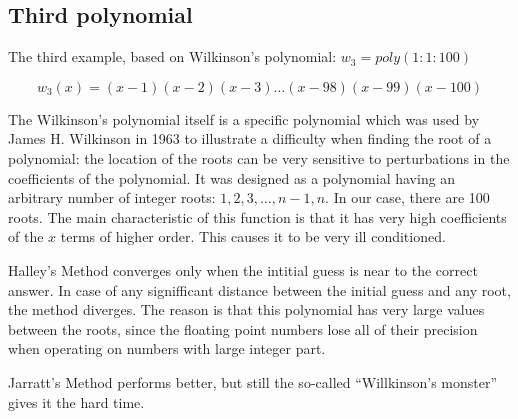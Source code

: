 \documentclass{article}
\begin{document}
\subsection{Third polynomial}
The third example, based on Wilkinson's polynomial: $w_3 = poly(1 : 1 : 100)$

\[w_3(x)=(x-1)(x-2)(x-3) \ldots (x-98)(x-99)(x-100)\]

The Wilkinson's polynomial itself is a specific polynomial which was used by James H. Wilkinson in
1963 to illustrate a difficulty when finding the root of a polynomial: the location of the roots can be
very sensitive to perturbations in the coefficients of the polynomial. It was designed as a
polynomial having an arbitrary number of integer roots: $1, 2, 3, \ldots ,n-1, n$. In our case,
there are 100 roots. The main characteristic of this function is that it has very high coefficients
of the $x$ terms of higher order. This causes it to be very ill conditioned.

Halley's Method converges only when the intitial guess is near to the correct answer. In case of any
signifficant distance between the initial guess and any root, the method diverges. The reason is
that this polynomial has very large values between the roots, since the floating point numbers
lose all of their precision when operating on numbers with large integer part.

Jarratt's Method performs better, but still the so-called ``Willkinson's monster'' gives it the hard
time.
\end{document}
